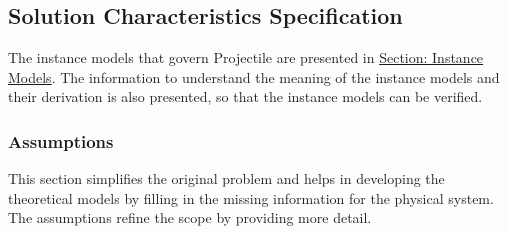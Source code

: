 \documentclass[12pt]{article}
\begin{document}
\subsection{Solution Characteristics Specification}
\label{Sec:SolCharSpec}
The instance models that govern Projectile are presented in \hyperref[Sec:IMs]{Section: Instance Models}. The information to understand the meaning of the instance models and their derivation is also presented, so that the instance models can be verified.

\subsubsection{Assumptions}
\label{Sec:Assumps}
This section simplifies the original problem and helps in developing the theoretical models by filling in the missing information for the physical system. The assumptions refine the scope by providing more detail.
\end{document}
